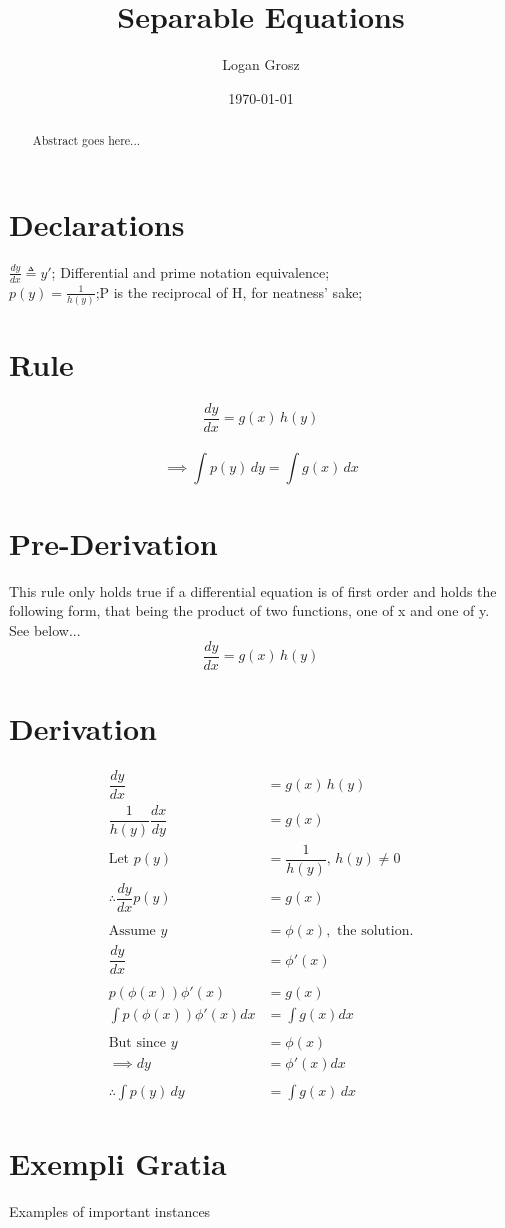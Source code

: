 \documentclass{article}
\begin{document}
	
\author{Logan Grosz}
\title{Separable Equations}
\date{\today}

\maketitle

\begin{abstract}
	Abstract goes here...
\end{abstract}

\section{Declarations}

$\frac{dy}{dx}\triangleq y'$; Differential and prime notation equivalence;\\
$p(y)=\frac{1}{h(y)}$;P is the reciprocal of H, for neatness' sake;

\section{Rule}
$$\dfrac{dy}{dx}=g(x)\,h(y)$$\\
$$\implies\int p(y)\,dy=\int g(x)\,dx$$

\section{Pre-Derivation}
This rule only holds true if a differential equation is of first order and holds the following form, that being the product of two functions, one of x and one of y. See below...\\

$$\dfrac{dy}{dx}=g(x)\,h(y)$$

\section{Derivation}

\begin{align*}
	\dfrac{dy}{dx}&=g(x)\,h(y)\\
	\dfrac{1}{h(y)}\dfrac{dx}{dy}&=g(x)\\
	\text{Let }p(y)&=\dfrac{1}{h(y)},\,h(y)\neq 0\\
	\therefore\dfrac{dy}{dx}p(y)&=g(x)\\\\
	\text{Assume }y&=\phi(x),\text{ the solution.}\\
	\dfrac{dy}{dx}&=\phi '(x)\\\\
	p(\phi(x))\phi '(x)&=g(x)\\
	\int p(\phi(x))\phi '(x)dx&=\int g(x) dx\\\\
	\text{But since }y&=\phi(x)\\
	\implies dy&=\phi '(x)dx\\\\
	\therefore \int p(y)\,dy&=\int g(x)\,dx
\end{align*}

\section{Exempli Gratia}

Examples of important instances
\end{document}
